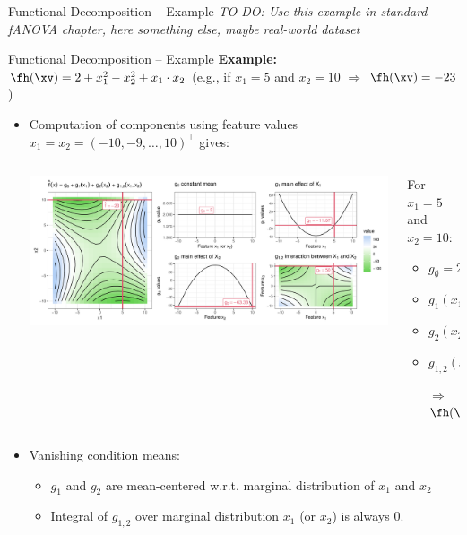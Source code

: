 \documentclass[11pt,compress,t,notes=noshow, aspectratio=169, xcolor=table]{beamer}
\newcommand{\open}{}
\newcommand{\close}{}
\begin{document}
\begin{frame}{Functional Decomposition -- Example}
\textit{TO DO: Use this example in standard fANOVA chapter, here something else, maybe real-world dataset}
\end{frame}

\begin{frame}{Functional Decomposition -- Example}
\textbf{Example:} $\fh(\xv) = 2 + x_1^2 - x_2^2 + x_1 \cdot x_2$ (e.g., if $x_1 = 5$ and $x_2 = 10$ $\Rightarrow$ $\fh(\xv) = -23$)

\begin{itemize}
    \item Computation of components using feature values $x_1 = x_2 = (-10, -9, \ldots, 10)^\top$ gives:
    \begin{columns}[c, totalwidth=\linewidth]
    \begin{column}{0.75\textwidth}
        \includegraphics[width = \textwidth]{figure/decomposition}
    \end{column}
    \begin{column}{0.25\textwidth}
    For $x_1 = 5$ and $x_2 = 10$:\\
    \begin{itemize}
        \item $g_{\open \emptyset \close} = 2$
        \item $g_{\open 1 \close}(x_1) = -9.67$
        \item $g_{\open 2 \close}(x_2) = -65.33$
        \item $g_{\open 1,2 \close}(x_1, x_2) = 50$
        \item[$\Rightarrow$] $\fh(\xv) = -23$
    \end{itemize}
    \end{column}
    \end{columns}
\pause
    \item Vanishing condition means:
    \begin{itemize}
        \item $g_1$ and $g_2$ are mean-centered w.r.t. marginal distribution of $x_1$ and $x_2$
        \item Integral of $g_{1,2}$ over marginal distribution $x_1$ (or $x_2$) is always 0.
    \end{itemize}
\end{itemize} 
\end{frame}
\end{document}
